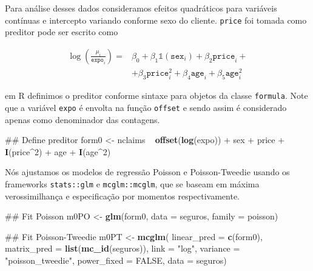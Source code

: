 \documentclass[9pt,a5paper,]{book}
\newenvironment{Shaded}{}{}
\newcommand{\KeywordTok}[1]{\textbf{{#1}}}
\newcommand{\DataTypeTok}[1]{\underline{{#1}}}
\newcommand{\DecValTok}[1]{{#1}}
\newcommand{\StringTok}[1]{{#1}}
\newcommand{\OtherTok}[1]{{#1}}
\newcommand{\NormalTok}[1]{{#1}}
\renewenvironment{Shaded}{\color{inputcolor}}{}
\renewcommand{\DataTypeTok}[1]{{#1}}
\theoremstyle{definition}
\theoremstyle{definition}
\theoremstyle{remark}
\begin{document}
Para análise desses dados consideramos efeitos quadráticos para
variáveis contínuas e intercepto variando conforme sexo do cliente.
\texttt{price} foi tomada como preditor pode ser escrito como

\begin{equation*}
  \begin{split}
  \log\left ( \frac{\mu_i}{\texttt{expo}_i} \right ) = &
  \beta_0 + \beta_1 \mathbb{1}(\texttt{sex}_i) +
  \beta_2 \texttt{price}_i + \\
  & + \beta_3 \texttt{price}_i^2 +
  \beta_4 \texttt{age}_i +
  \beta_5 \texttt{age}_i^2
  \end{split}
\end{equation*}

em R definimos o preditor conforme sintaxe para objetos da classe
\texttt{formula}. Note que a variável \texttt{expo} é envolta na função
\texttt{offset} e sendo assim é considerado apenas como denominador das
contagens.

\begin{Shaded}
\begin{Highlighting}[]
\NormalTok{## Define preditor}
\NormalTok{form0 <-}\StringTok{ }\NormalTok{nclaims ~}\StringTok{ }\KeywordTok{offset}\NormalTok{(}\KeywordTok{log}\NormalTok{(expo)) +}\StringTok{ }\NormalTok{sex +}
\StringTok{    }\NormalTok{price +}\StringTok{ }\KeywordTok{I}\NormalTok{(price^}\DecValTok{2}\NormalTok{) +}\StringTok{ }\NormalTok{age +}\StringTok{ }\KeywordTok{I}\NormalTok{(age^}\DecValTok{2}\NormalTok{)}
\end{Highlighting}
\end{Shaded}

Nós ajustamos os modelos de regressão Poisson e Poisson-Tweedie usando
os frameworks \texttt{stats::glm} e \texttt{mcglm::mcglm}, que se baseam
em máxima verossimilhança e especificação por momentos respectivamente.

\begin{Shaded}
\begin{Highlighting}[]
\NormalTok{## Fit Poisson}
\NormalTok{m0PO <-}\StringTok{ }\KeywordTok{glm}\NormalTok{(form0, }\DataTypeTok{data =} \NormalTok{seguros, }\DataTypeTok{family =} \NormalTok{poisson)}

\NormalTok{## Fit Poisson-Tweedie}
\NormalTok{m0PT <-}\StringTok{ }\KeywordTok{mcglm}\NormalTok{(}
    \DataTypeTok{linear_pred =} \KeywordTok{c}\NormalTok{(form0),}
    \DataTypeTok{matrix_pred =} \KeywordTok{list}\NormalTok{(}\KeywordTok{mc_id}\NormalTok{(seguros)),}
    \DataTypeTok{link =} \StringTok{"log"}\NormalTok{,}
    \DataTypeTok{variance =} \StringTok{"poisson_tweedie"}\NormalTok{,}
    \DataTypeTok{power_fixed =} \OtherTok{FALSE}\NormalTok{,}
    \DataTypeTok{data =} \NormalTok{seguros)}
\end{Highlighting}
\end{Shaded}
\end{document}
